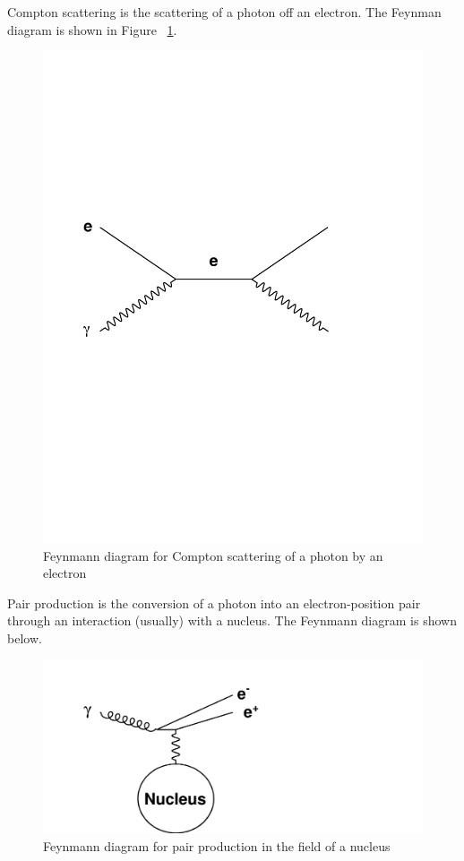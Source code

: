 Compton scattering is the scattering of a photon off an electron.  The Feynman diagram is shown in Figure ~\ref{fig:compton}. 


\begin{figure}[h]
\centering\includegraphics[scale=0.5]{./particleinteractions/Pictures/compton.pdf}
\caption{Feynmann diagram for Compton scattering of a photon by an electron}
\label{fig:compton}
\end{figure}

Pair production is the conversion of a photon into an electron-position pair through an interaction (usually) with a nucleus.  The Feynmann diagram is shown below.


\begin{figure}[h]
\centering\includegraphics[scale=0.5]{./particleinteractions/Pictures/pairproduction.pdf}
\caption{Feynmann diagram for pair production in the field of a nucleus}
\label{fig:pairproduction}
\end{figure}



